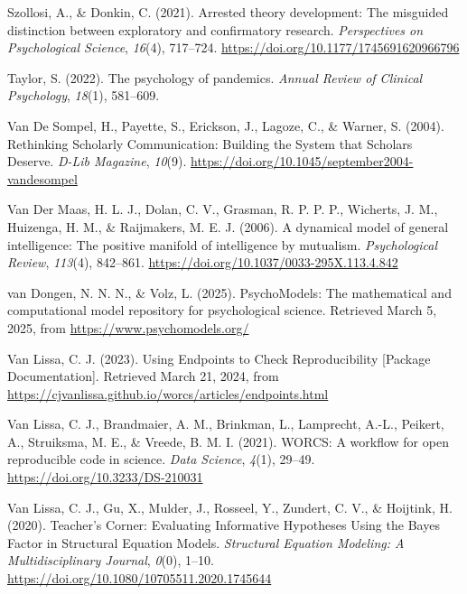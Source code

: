 \documentclass[
  man, noextraspace,floatsintext]{apa6}
\newlength{\cslhangindent}
\newenvironment{CSLReferences}[2] %
 {\begin{list}{}{%
  \setlength{\itemindent}{0pt}
  \setlength{\leftmargin}{0pt}
  \setlength{\parsep}{0pt}
  \ifodd #1
   \setlength{\leftmargin}{\cslhangindent}
   \setlength{\itemindent}{-1\cslhangindent}
  \fi
  \setlength{\itemsep}{#2\baselineskip}}}
 {\end{list}}
\begin{document}
\begin{CSLReferences}{1}{0}
Szollosi, A., \& Donkin, C. (2021). Arrested theory development: {The} misguided distinction between exploratory and confirmatory research. \emph{Perspectives on Psychological Science}, \emph{16}(4), 717--724. \url{https://doi.org/10.1177/1745691620966796}

Taylor, S. (2022). The psychology of pandemics. \emph{Annual Review of Clinical Psychology}, \emph{18}(1), 581--609.

Van De Sompel, H., Payette, S., Erickson, J., Lagoze, C., \& Warner, S. (2004). Rethinking {Scholarly Communication}: {Building} the {System} that {Scholars Deserve}. \emph{D-Lib Magazine}, \emph{10}(9). \url{https://doi.org/10.1045/september2004-vandesompel}

Van Der Maas, H. L. J., Dolan, C. V., Grasman, R. P. P. P., Wicherts, J. M., Huizenga, H. M., \& Raijmakers, M. E. J. (2006). A dynamical model of general intelligence: {The} positive manifold of intelligence by mutualism. \emph{Psychological Review}, \emph{113}(4), 842--861. \url{https://doi.org/10.1037/0033-295X.113.4.842}

van Dongen, N. N. N., \& Volz, L. (2025). {PsychoModels}: {The} mathematical and computational model repository for psychological science. Retrieved March 5, 2025, from \url{https://www.psychomodels.org/}

Van Lissa, C. J. (2023). Using {Endpoints} to {Check Reproducibility} {[}Package Documentation{]}. Retrieved March 21, 2024, from \url{https://cjvanlissa.github.io/worcs/articles/endpoints.html}

Van Lissa, C. J., Brandmaier, A. M., Brinkman, L., Lamprecht, A.-L., Peikert, A., Struiksma, M. E., \& Vreede, B. M. I. (2021). {WORCS}: {A} workflow for open reproducible code in science. \emph{Data Science}, \emph{4}(1), 29--49. \url{https://doi.org/10.3233/DS-210031}

Van Lissa, C. J., Gu, X., Mulder, J., Rosseel, Y., Zundert, C. V., \& Hoijtink, H. (2020). Teacher's {Corner}: {Evaluating Informative Hypotheses Using} the {Bayes Factor} in {Structural Equation Models}. \emph{Structural Equation Modeling: A Multidisciplinary Journal}, \emph{0}(0), 1--10. \url{https://doi.org/10.1080/10705511.2020.1745644}


\end{CSLReferences}
\end{document}
